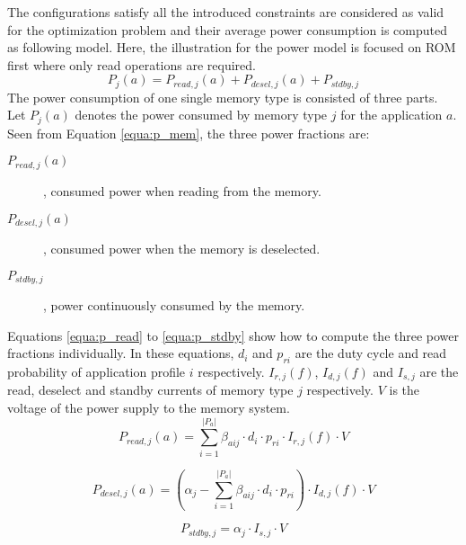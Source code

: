 	The configurations satisfy all the introduced constraints are considered
	as valid for the optimization problem and their average power consumption
	is computed as following model. Here, the illustration for the power model
	is focused on ROM first where only read operations are required.
	\begin{equation}
	\label{equa:p_mem}
		P_{j}\left( a \right) =
		P_{read,j}\left( a \right) +
		P_{desel,j}\left( a \right) +
		P_{stdby,j}
	\end{equation}
	The power consumption of one single memory type is consisted of three parts.
	Let $P_{j} \left( a \right) $ denotes the power consumed by memory type $j$
	for the application $a$. Seen from Equation \ref{equa:p_mem}, the three power
	fractions are:
	\begin{description}
		\item[$P_{read,j} \left( a \right) $]
			, consumed power when reading from the memory.
		\item[$P_{desel,j} \left( a \right) $]
			, consumed power when the memory is deselected.
		\item[$P_{stdby,j}$]
			, power continuously consumed by the memory.
	\end{description}
	Equations \ref{equa:p_read} to \ref{equa:p_stdby} show how to compute
	the three power fractions individually. In these equations,
	$d_{i}$ and $p_{ri}$ are the duty cycle and read probability of application
	profile $i$ respectively.
	$I_{r,j}\left( f \right)$, $I_{d,j}\left( f \right)$ and $I_{s,j}$
	are the read, deselect and standby currents of memory type $j$ respectively.
	$V$ is the voltage of the power supply to the memory system.
	\begin{equation}
	\label{equa:p_read}
		P_{read,j}\left( a \right) = 
		\sum_{i=1}^{\lvert P_{a} \rvert} \beta_{aij}
		\cdot d_{i} \cdot p_{ri}
		\cdot I_{r,j}\left( f \right) \cdot V
	\end{equation}
			
	\begin{equation}
	\label{equa:p_desel}
		P_{desel,j}\left( a \right) =
		\left( \alpha_{j} - 
		\sum_{i=1}^{\lvert P_{a} \rvert} \beta_{aij}
		\cdot d_{i} \cdot p_{ri}
		\right)
		\cdot I_{d,j}\left( f \right) \cdot V
	\end{equation}

	\begin{equation}
	\label{equa:p_stdby}
		P_{stdby,j} =
		\alpha_{j} \cdot I_{s,j} \cdot V
	\end{equation}		

